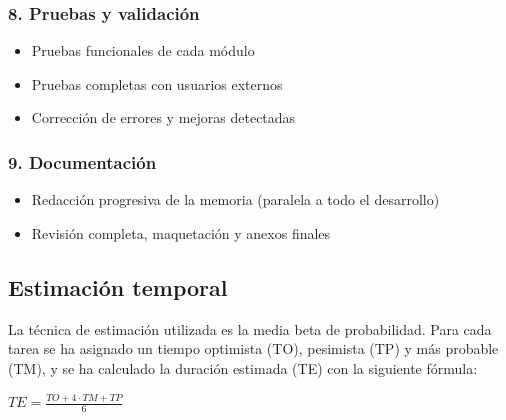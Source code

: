 \subsubsection*{8. Pruebas y validación}
\begin{itemize}
  \item Pruebas funcionales de cada módulo
  \item Pruebas completas con usuarios externos
  \item Corrección de errores y mejoras detectadas
\end{itemize}

\subsubsection*{9. Documentación}
\begin{itemize}
  \item Redacción progresiva de la memoria (paralela a todo el desarrollo)
  \item Revisión completa, maquetación y anexos finales
\end{itemize}

\subsection{Estimación temporal}
La técnica de estimación utilizada es la media beta de probabilidad. Para cada tarea se ha asignado un tiempo optimista (TO), pesimista (TP) y más probable (TM), y se ha calculado la duración estimada (TE) con la siguiente fórmula:

\begin{center}
$TE = \frac{TO + 4 \cdot TM + TP}{6}$
\end{center}

